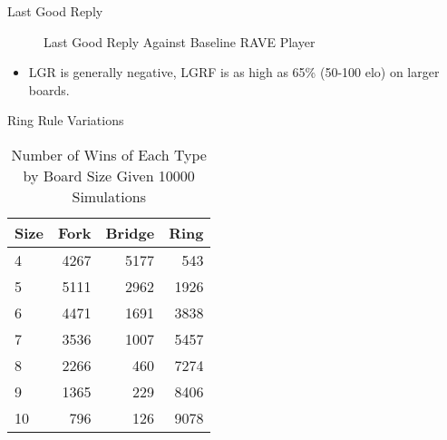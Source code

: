 \documentclass{beamer} %
\begin{document}
\begin{frame}{Last Good Reply}
\begin{figure}
	\centering
{}
	\caption{Last Good Reply Against Baseline RAVE Player}
	\label{fig:lgr}
\end{figure}
\begin{itemize}
\item LGR is generally negative, LGRF is as high as 65\% (50-100 elo) on larger boards.
\end{itemize}
\end{frame}

\begin{frame}{Ring Rule Variations}
\begin{table}
	\centering
	\begin{tabular}{l|rrr}
		Size & Fork & Bridge & Ring \\ \hline
		   4 & 4267 &   5177 &  543 \\
		   5 & 5111 &   2962 & 1926 \\
		   6 & 4471 &   1691 & 3838 \\
		   7 & 3536 &   1007 & 5457 \\
		   8 & 2266 &    460 & 7274 \\
		   9 & 1365 &    229 & 8406 \\
		   10 & 796 &    126 & 9078 \\
	\end{tabular}
	\caption{Number of Wins of Each Type by Board Size Given 10000 Simulations}
	\label{tab:wintypes}
\end{table}
\end{frame}
\end{document}
